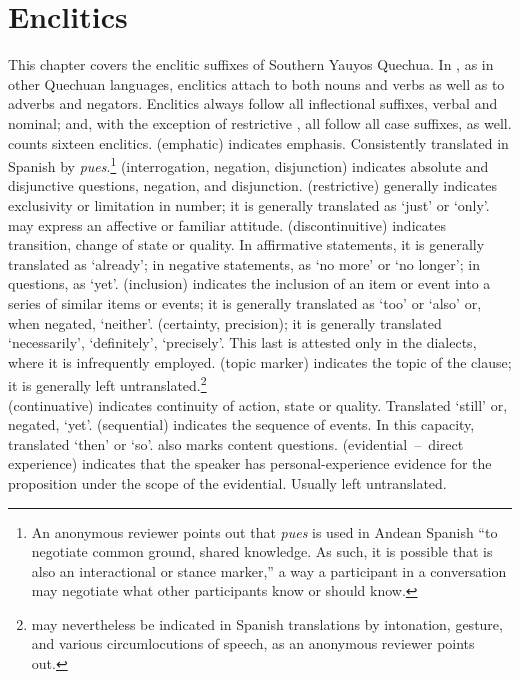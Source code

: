 \chapter{Enclitics}\label{ch:enclitics}
This chapter covers the enclitic suffixes of Southern Yauyos Quechua. In \SYQ, as in other Quechuan languages, enclitics attach to both nouns and verbs as well as to adverbs and negators. Enclitics always follow all inflectional suffixes, verbal and nominal; and, with the exception of restrictive , all follow all case suffixes, as well. \SYQ{} counts sixteen enclitics.  (emphatic) indicates emphasis. Consistently translated in Spanish by \textit{pues}.\footnote{An anonymous reviewer points out that \emph{pues} is used in Andean Spanish “to negotiate common ground, shared knowledge. As such, it is possible that  is also an interactional or stance marker,” a way a participant in a conversation may negotiate what other participants know or should know.}  (interrogation, negation, disjunction) indicates absolute and disjunctive questions, negation, and disjunction.  (restrictive) generally indicates exclusivity or limitation in number; it is generally translated as ‘just’ or ‘only’.  may express an affective or familiar attitude.  (discontinuitive) indicates transition, change of state or quality. In affirmative statements, it is generally translated as ‘already’; in negative statements, as ‘no more’ or ‘no longer’; in questions, as ‘yet’.  (inclusion) indicates the inclusion of an item or event into a series of similar items or events; it is generally translated as ‘too’ or ‘also’ or, when negated, ‘neither’.  (certainty, precision); it is generally translated ‘necessarily’, ‘definitely’, ‘precisely’. This last is attested only in the \QII{} dialects, where it is infrequently employed.  (topic marker) indicates the topic of the clause; it is generally left untranslated.\footnote{ may nevertheless be indicated in Spanish translations by intonation, gesture, and various circumlocutions of speech, as an anonymous reviewer points out.}\\
 (continuative) indicates continuity of action, state or quality. Translated ‘still’ or, negated, ‘yet’.  (sequential) indicates the sequence of events. In this capacity, translated ‘then’ or ‘so’.  also marks content questions.  (evidential~--~direct experience) indicates that the speaker has personal-experience evidence for the proposition under the scope of the evidential. Usually left untranslated.\\
